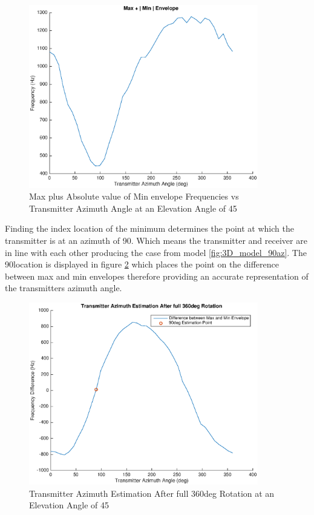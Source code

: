  \begin{figure}
	\begin{center}
		\includegraphics[width=10cm]{images/results/Azimuth_angle_estimation_max_plus_absMin.eps}
		\caption{Max plus Absolute value of Min envelope Frequencies vs Transmitter Azimuth Angle at an Elevation Angle of 45\textdegree}
		\label{fig:azimuth_estimation_max_plus_absMin}
	\end{center}
\end{figure}

Finding the index location of the minimum determines the point at which the transmitter is at an azimuth of 90\textdegree. Which means the transmitter and receiver are in line with each other producing the case from model \ref{fig:3D_model_90az}. The 90\textdegree \space location is displayed in figure \ref{fig:azimuth_estimation_plotted} which places the point on the difference between max and min envelopes therefore providing an accurate representation of the transmitters azimuth angle.

  \begin{figure}
	\begin{center}
		\includegraphics[width=10cm]{images/results/Azimuth_angle_estimation_plotted.eps}
		\caption{Transmitter Azimuth Estimation After full 360deg Rotation at an Elevation Angle of 45\textdegree}
		\label{fig:azimuth_estimation_plotted}
	\end{center}
\end{figure}

